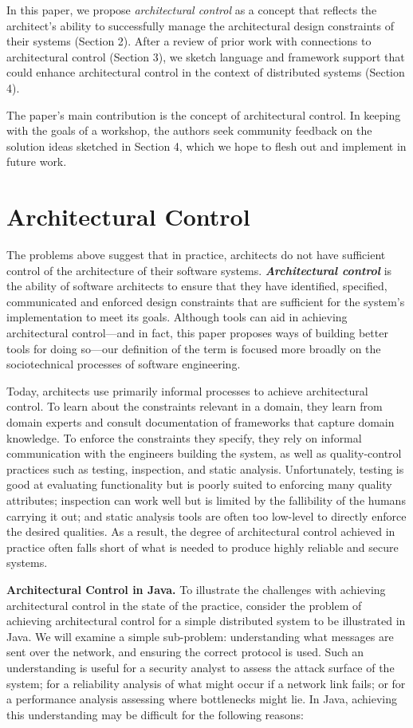 \documentclass[runningheads]{llncs}
\newcommand{\minisec}[1]{\vspace{2ex}\noindent\textbf{#1}}
\begin{document}
\begin{sloppypar}
In this paper, we propose \emph{architectural control} as a concept that reflects the architect's ability to successfully manage the architectural design constraints of their systems (Section 2).  After a review of prior work with connections to architectural control (Section 3), we sketch language and framework support that could enhance architectural control in the context of distributed systems (Section 4).

The paper's main contribution is the concept of architectural control.  In keeping with the goals of a workshop, the authors seek community feedback on the solution ideas sketched in Section 4, which we hope to flesh out and implement in future work.


\section{Architectural Control}

The problems above suggest that in practice, architects do not have sufficient control of the architecture of their software systems.  \emph{\textbf{Architectural control}} is the ability of software architects to ensure that they have identified, specified, communicated and enforced design constraints that are sufficient for the system's implementation to meet its goals.  Although tools can aid in achieving architectural control---and in fact, this paper proposes ways of building better tools for doing so---our definition of the term is focused more broadly on the sociotechnical processes of software engineering.

Today, architects use primarily informal processes to achieve architectural control.  To learn about the constraints relevant in a domain, they learn from domain experts and consult documentation of frameworks that capture domain knowledge.  To enforce the constraints they specify, they rely on informal communication with the engineers building the system, as well as quality-control practices such as testing, inspection, and static analysis.  Unfortunately, testing is good at evaluating functionality but is poorly suited to enforcing many quality attributes; inspection can work well but is limited by the fallibility of the humans carrying it out; and static analysis tools are often too low-level to directly enforce the desired qualities.  As a result, the degree of architectural control achieved in practice often falls short of what is needed to produce highly reliable and secure systems.


\minisec{Architectural Control in Java.}  To illustrate the challenges with achieving architectural control in the state of the practice, consider the problem of achieving architectural control for a simple distributed system to be illustrated in Java.  We will examine a simple sub-problem: understanding what messages are sent over the network, and ensuring the correct protocol is used.  Such an understanding is useful for a security analyst to assess the attack surface of the system; for a reliability analysis of what might occur if a network link fails; or for a performance analysis assessing where bottlenecks might lie.  In Java, achieving this understanding may be difficult for the following reasons:


\end{sloppypar}
\end{document}
